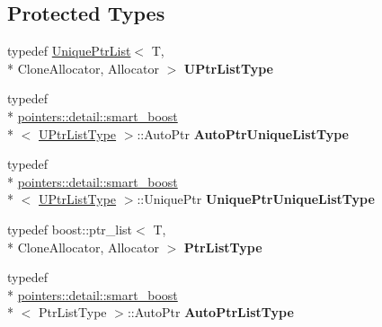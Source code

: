 \subsection*{Protected Types}
\begin{DoxyCompactItemize}
\item 
\hypertarget{classcore_1_1container_1_1_unique_ptr_list_ac6f231d08e6beaac3c7dcd0804d6101f}{typedef \hyperlink{classcore_1_1container_1_1_unique_ptr_list}{Unique\-Ptr\-List}$<$ T, \\*
Clone\-Allocator, Allocator $>$ {\bfseries U\-Ptr\-List\-Type}}\label{classcore_1_1container_1_1_unique_ptr_list_ac6f231d08e6beaac3c7dcd0804d6101f}

\item 
\hypertarget{classcore_1_1container_1_1_unique_ptr_list_a69baa6f88fa7581a637bce96b8016e25}{typedef \\*
\hyperlink{structcore_1_1pointers_1_1detail_1_1smart__boost}{pointers\-::detail\-::smart\-\_\-boost}\\*
$<$ \hyperlink{classcore_1_1container_1_1_unique_ptr_list}{U\-Ptr\-List\-Type} $>$\-::Auto\-Ptr {\bfseries Auto\-Ptr\-Unique\-List\-Type}}\label{classcore_1_1container_1_1_unique_ptr_list_a69baa6f88fa7581a637bce96b8016e25}

\item 
\hypertarget{classcore_1_1container_1_1_unique_ptr_list_a714385ee5c71dac26c398e9466af5ae5}{typedef \\*
\hyperlink{structcore_1_1pointers_1_1detail_1_1smart__boost}{pointers\-::detail\-::smart\-\_\-boost}\\*
$<$ \hyperlink{classcore_1_1container_1_1_unique_ptr_list}{U\-Ptr\-List\-Type} $>$\-::Unique\-Ptr {\bfseries Unique\-Ptr\-Unique\-List\-Type}}\label{classcore_1_1container_1_1_unique_ptr_list_a714385ee5c71dac26c398e9466af5ae5}

\item 
\hypertarget{classcore_1_1container_1_1_unique_ptr_list_a41472b0f8a81bb5976b071d43a189f85}{typedef boost\-::ptr\-\_\-list$<$ T, \\*
Clone\-Allocator, Allocator $>$ {\bfseries Ptr\-List\-Type}}\label{classcore_1_1container_1_1_unique_ptr_list_a41472b0f8a81bb5976b071d43a189f85}

\item 
\hypertarget{classcore_1_1container_1_1_unique_ptr_list_a026cce44c2bb60a54b7375bd05f3ee1e}{typedef \\*
\hyperlink{structcore_1_1pointers_1_1detail_1_1smart__boost}{pointers\-::detail\-::smart\-\_\-boost}\\*
$<$ Ptr\-List\-Type $>$\-::Auto\-Ptr {\bfseries Auto\-Ptr\-List\-Type}}\label{classcore_1_1container_1_1_unique_ptr_list_a026cce44c2bb60a54b7375bd05f3ee1e}


\end{DoxyCompactItemize}
